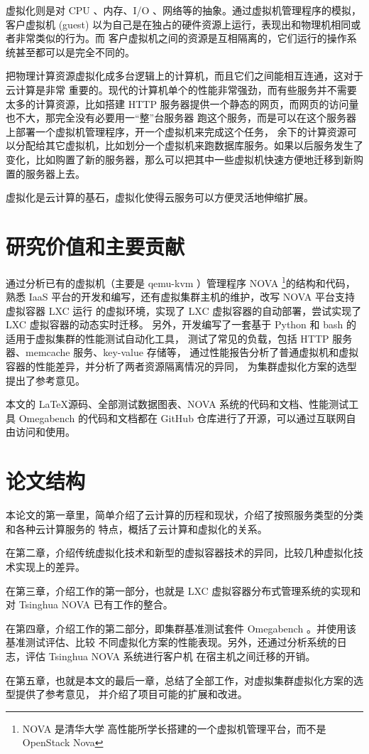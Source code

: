 虚拟化则是对 CPU 、内存、I/O 、网络等的抽象。通过虚拟机管理程序的模拟，客户虚拟机
(guest) 以为自己是在独占的硬件资源上运行，表现出和物理机相同或者非常类似的行为。而
客户虚拟机之间的资源是互相隔离的，它们运行的操作系统甚至都可以是完全不同的。

把物理计算资源虚拟化成多台逻辑上的计算机，而且它们之间能相互连通，这对于云计算是非常
重要的。现代的计算机单个的性能非常强劲，而有些服务并不需要太多的计算资源，比如搭建
HTTP 服务器提供一个静态的网页，而网页的访问量也不大，那完全没有必要用一“整”台服务器
跑这个服务，而是可以在这个服务器上部署一个虚拟机管理程序，开一个虚拟机来完成这个任务，
余下的计算资源可以分配给其它虚拟机，比如划分一个虚拟机来跑数据库服务。如果以后服务发生了
变化，比如购置了新的服务器，那么可以把其中一些虚拟机快速方便地迁移到新购置的服务器上去。

虚拟化是云计算的基石，虚拟化使得云服务可以方便灵活地伸缩扩展。

\section{研究价值和主要贡献}

通过分析已有的虚拟机（主要是 qemu-kvm ）管理程序 NOVA \footnote{NOVA 是清华大学
高性能所学长搭建的一个虚拟机管理平台，而不是 OpenStack Nova }的结构和代码，熟悉
IaaS 平台的开发和编写，还有虚拟集群主机的维护，改写 NOVA 平台支持虚拟容器 LXC 运行
的虚拟环境，实现了 LXC 虚拟容器的自动部署，尝试实现了 LXC 虚拟容器的动态实时迁移。
另外，开发编写了一套基于 Python 和 bash 的适用于虚拟集群的性能测试自动化工具，
测试了常见的负载，包括 HTTP 服务器、memcache 服务、key-value 存储等，
通过性能报告分析了普通虚拟机和虚拟容器的性能差异，并分析了两者资源隔离情况的异同，
为集群虚拟化方案的选型提出了参考意见。

本文的 \LaTeX 源码、全部测试数据图表、NOVA 系统的代码和文档、性能测试工具 Omegabench
的代码和文档都在 GitHub 仓库进行了开源，可以通过互联网自由访问和使用。

\section{论文结构}

本论文的第一章里，简单介绍了云计算的历程和现状，介绍了按照服务类型的分类和各种云计算服务的
特点，概括了云计算和虚拟化的关系。

在第二章，介绍传统虚拟化技术和新型的虚拟容器技术的异同，比较几种虚拟化技术实现上的差异。

在第三章，介绍工作的第一部分，也就是 LXC 虚拟容器分布式管理系统的实现和对 Tsinghua NOVA
已有工作的整合。

在第四章，介绍工作的第二部分，即集群基准测试套件 Omegabench 。并使用该基准测试评估、比较
不同虚拟化方案的性能表现。另外，还通过分析系统的日志，评估 Tsinghua NOVA 系统进行客户机
在宿主机之间迁移的开销。

在第五章，也就是本文的最后一章，总结了全部工作，对虚拟集群虚拟化方案的选型提供了参考意见，
并介绍了项目可能的扩展和改进。
